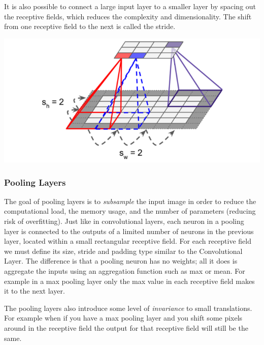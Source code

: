 \documentclass[12pt]{article}
\begin{document}
            It is also possible to connect a large input layer to a smaller layer by spacing out the receptive fields, which reduces the
            complexity and dimensionality. The shift from one receptive field to the next is called the stride. 
            
            \begin{center}
                \includegraphics[scale=0.65]{ConvStride}
            \end{center}

        \subsubsection{Pooling Layers}
            The goal of pooling layers is to \textit{subsample} the input image in order to reduce the computational
            load, the memory usage, and the number of parameters (reducing risk of overfitting). Just like in
            convolutional layers, each neuron in a pooling layer is connected to the outputs of a limited number of
            neurons in the previous layer, located within a small rectangular receptive field. For each receptive field
            we must define its size, stride and padding type similar to the Convolutional Layer. The difference is that
            a pooling neuron has no weights; all it does is aggregate the inputs using an aggregation function such as
            max or mean. For example in a max pooling layer only the max value in each receptive field makes it to the
            next layer.

            The pooling layers also introduce some level of \textit{invariance} to small translations. For example when
            if you have a max pooling layer and you shift some pixels around in the receptive field the output for that
            receptive field will still be the same. 
        
\end{document}

